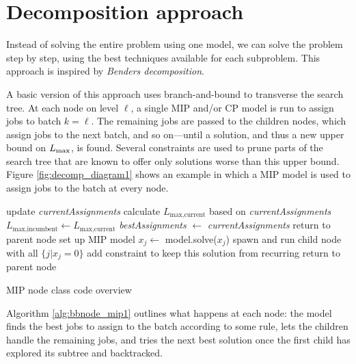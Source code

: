 \documentclass[13pt, letterpaper, oneside]{book}
\begin{document}
\section{Decomposition approach}

Instead of solving the entire problem using one model, we can solve the problem
step by step, using the best techniques available for each subproblem. This
approach is inspired by \textit{Benders decomposition}.


\label{sec:mipdecomp}
A basic version of this approach uses branch-and-bound to transverse the search
tree. At each node on level $\ell$, a single MIP and/or CP model is run to
assign jobs to batch $k = \ell$. The remaining jobs are passed to the children
nodes, which assign jobs to the next batch, and so on---until a solution, and
thus a new upper bound on $L_{\text{max}}$, is found. Several constraints are used to
prune parts of the search tree that are known to offer only solutions worse than
this upper bound. Figure \ref{fig:decomp_diagram1} shows an example in which a
MIP model is used to assign jobs to the batch at every node.
\begin{algorithm}[h]
\fontsize{9pt}{11.5pt}\selectfont
\begin{algorithmic}
\State update \textit{currentAssignments} 
 
  \State calculate $L_{\text{max,current}}$ based on \textit{currentAssignments}
    \State $L_{\text{max,incumbent}} \gets L_{\text{max,current}}$
    \State \textit{bestAssignments} $\gets$ \textit{currentAssignments}
  \EndIf
  \State return to parent node
\EndIf
\State set up MIP model 
\Repeat
  \State $x_j \gets$ model.solve($x_j$) 
  \State spawn and run child node with all $\{j | x_j = 0\}$ 
  \State add constraint to keep this solution from recurring 
\State return to parent node
\end{algorithmic}
\caption{MIP node class code overview}
\label{alg:bbnode_mip1}
\end{algorithm}
Algorithm \ref{alg:bbnode_mip1} outlines what happens at each node: the model
finds the best jobs to assign to the batch according to some rule, lets the
children handle the remaining jobs, and tries the next best solution once the
first child has explored its subtree and backtracked.
\end{document}
